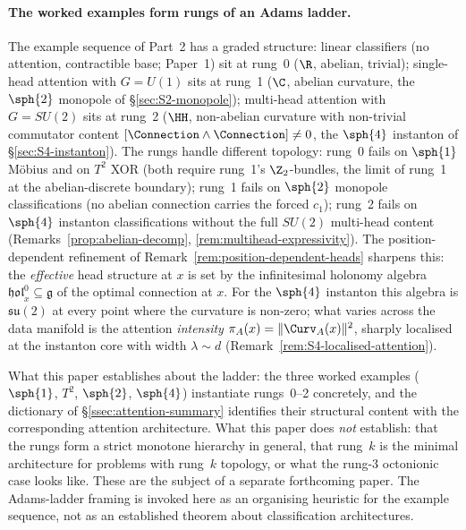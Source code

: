 \paragraph{The worked examples form rungs of an Adams ladder.}
The example sequence of Part~2 has a graded structure:
linear classifiers (no attention, contractible base; Paper~1)
sit at rung~0 ($\R$, abelian, trivial); single-head attention with
$G=U(1)$ sits at rung~1 ($\C$, abelian curvature, the $\sph{2}$
monopole of \S\ref{sec:S2-monopole}); multi-head attention with
$G=SU(2)$ sits at rung~2 ($\HH$, non-abelian curvature with
non-trivial commutator content
$[\Connection\wedge\Connection]\neq 0$, the $\sph{4}$ instanton
of \S\ref{sec:S4-instanton}). The rungs handle different topology:
rung~0 fails on $\sph{1}$ M\"obius and on $T^2$ XOR (both
require rung~1's $\Z_2$-bundles, the limit of rung~1 at the
abelian-discrete boundary); rung~1 fails on $\sph{2}$ monopole
classifications (no abelian connection carries the forced $c_1$);
rung~2 fails on $\sph{4}$ instanton classifications without the
full $SU(2)$ multi-head content
(Remarks~\ref{prop:abelian-decomp},
\ref{rem:multihead-expressivity}). The position-dependent
refinement of Remark~\ref{rem:position-dependent-heads} sharpens
this: the \emph{effective} head structure at $x$ is set by the
infinitesimal holonomy algebra
$\mathfrak{hol}^0_x\subseteq\mathfrak{g}$ of the optimal connection
at $x$. For the $\sph{4}$ instanton this algebra is
$\mathfrak{su}(2)$ at every point where the curvature is non-zero;
what varies across the data manifold is the attention
\emph{intensity} $\pi_A(x)=\|\Curv_A(x)\|^2$, sharply localised at
the instanton core with width $\lambda\sim d$
(Remark~\ref{rem:S4-localised-attention}).

What this paper establishes about the ladder: the three worked
examples ($\sph{1}$, $T^2$, $\sph{2}$, $\sph{4}$) instantiate
rungs~0--2 concretely, and the dictionary of \S\ref{ssec:attention-summary}
identifies their structural content with the corresponding
attention architecture. What this paper does \emph{not} establish:
that the rungs form a strict monotone hierarchy in general, that
rung~$k$ is the minimal architecture for problems with rung~$k$
topology, or what the rung-3 octonionic case looks like. These
are the subject of a separate forthcoming paper. The Adams-ladder
framing is invoked here as an organising heuristic for the
example sequence, not as an established theorem about
classification architectures.

